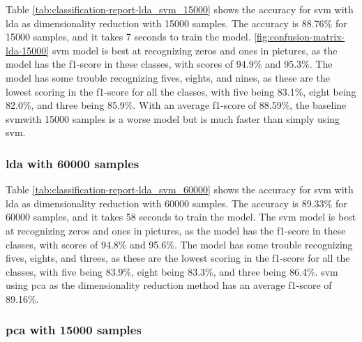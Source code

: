 Table \ref{tab:classification-report-lda_svm_15000} shows the accuracy for \gls{svm} with \gls{lda} as dimensionality reduction with 15000 samples. The accuracy is 88.76\% for 15000 samples, and it takes 7 seconds to train the model. \autoref{fig:confusion-matrix-lda-15000} \gls{svm} model is best at recognizing zeros and ones in pictures, as the model has the f1-score in these classes, with scores of 94.9\% and 95.3\%. The model has some trouble recognizing fives, eights, and nines, as these are the lowest scoring in the f1-score for all the classes, with five being 83.1\%, eight being 82.0\%, and three being 85.9\%. With an average f1-score of 88.59\%, the baseline \gls{svm}with 15000 samples is a worse model but is much faster than simply using \gls{svm}.
\subsubsection{\gls{lda} with 60000 samples}\label{subsubsec:experiment-1-results-lda-60000}





Table \ref{tab:classification-report-lda_svm_60000} shows the accuracy for \gls{svm} with \gls{lda} as dimensionality reduction with 60000 samples. The accuracy is 89.33\% for 60000 samples, and it takes 58 seconds to train the model. The \gls{svm} model is best at recognizing zeros and ones in pictures, as the model has the f1-score in these classes, with scores of 94.8\% and 95.6\%. The model has some trouble recognizing fives, eights, and threes, as these are the lowest scoring in the f1-score for all the classes, with five being 83.9\%, eight being 83.3\%, and three being 86.4\%. \gls{svm} using \gls{pca} as the dimensionality reduction method has an average f1-score of 89.16\%.

\subsubsection{\gls{pca} with 15000 samples}\label{subsubsec:experiment-1-results-pca-15000}





